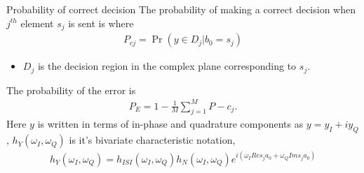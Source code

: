 \documentclass{beamer}
\providecommand{\pr}[1]{\ensuremath{\Pr\left(#1\right)}}
\begin{document}
\begin{frame}{}
    \begin{block}{Probability of correct decision}
     The probability of making a correct decision when $j^{th}$ element $s_j$ is sent is 
     where
     \begin{align}
         P_{cj} = \pr{y\in D_j | b_0 = s_j}
     \end{align}
     \begin{itemize}
         \item $D_j$ is the decision region in the complex plane corresponding to $s_j$. 
     \end{itemize}
     The probability of the error is 
     \begin{align}
         P_E = 1 - \frac{1}{M}\sum_{j=1}^{M} P-{c_{j}}.
     \end{align}
   Here $y$ is written in terms of in-phase and quadrature components as $y=y_I+iy_Q$ , $h_Y(\omega_I,\omega_Q)$ is it's bivariate characteristic notation,
    \begin{align}
        h_Y(\omega_I,\omega_Q)=h_{ISI}(\omega_I,\omega_Q)h_N(\omega_I,\omega_Q)e^{i(\omega_IRe{s_ja_0}+\omega_Q{Ims_ja_0})}
    \end{align}
    \end{block}
\end{frame}
\end{document}
